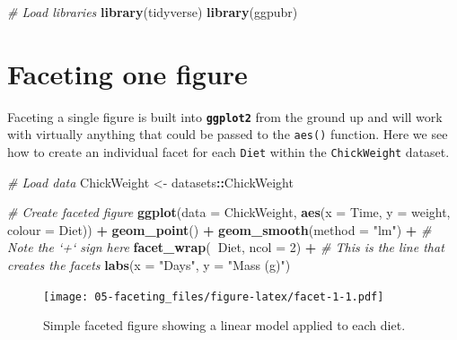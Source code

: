 \documentclass[]{book}
\newenvironment{Shaded}{\begin{snugshade}}{\end{snugshade}}
\newcommand{\KeywordTok}[1]{\textcolor[rgb]{0.13,0.29,0.53}{\textbf{#1}}}
\newcommand{\DataTypeTok}[1]{\textcolor[rgb]{0.13,0.29,0.53}{#1}}
\newcommand{\DecValTok}[1]{\textcolor[rgb]{0.00,0.00,0.81}{#1}}
\newcommand{\StringTok}[1]{\textcolor[rgb]{0.31,0.60,0.02}{#1}}
\newcommand{\CommentTok}[1]{\textcolor[rgb]{0.56,0.35,0.01}{\textit{#1}}}
\newcommand{\OperatorTok}[1]{\textcolor[rgb]{0.81,0.36,0.00}{\textbf{#1}}}
\newcommand{\NormalTok}[1]{#1}
\theoremstyle{definition}
\theoremstyle{definition}
\theoremstyle{definition}
\theoremstyle{remark}
\begin{document}
\begin{Shaded}
\begin{Highlighting}[]
\CommentTok{# Load libraries}
\KeywordTok{library}\NormalTok{(tidyverse)}
\KeywordTok{library}\NormalTok{(ggpubr)}
\end{Highlighting}
\end{Shaded}

\section{Faceting one figure}\label{faceting-one-figure}

Faceting a single figure is built into \textbf{\texttt{ggplot2}} from
the ground up and will work with virtually anything that could be passed
to the \texttt{aes()} function. Here we see how to create an individual
facet for each \texttt{Diet} within the \texttt{ChickWeight} dataset.

\begin{Shaded}
\begin{Highlighting}[]
\CommentTok{# Load data}
\NormalTok{ChickWeight <-}\StringTok{ }\NormalTok{datasets}\OperatorTok{::}\NormalTok{ChickWeight}

\CommentTok{# Create faceted figure}
\KeywordTok{ggplot}\NormalTok{(}\DataTypeTok{data =}\NormalTok{ ChickWeight, }\KeywordTok{aes}\NormalTok{(}\DataTypeTok{x =}\NormalTok{ Time, }\DataTypeTok{y =}\NormalTok{ weight, }\DataTypeTok{colour =}\NormalTok{ Diet)) }\OperatorTok{+}
\StringTok{  }\KeywordTok{geom_point}\NormalTok{() }\OperatorTok{+}
\StringTok{  }\KeywordTok{geom_smooth}\NormalTok{(}\DataTypeTok{method =} \StringTok{"lm"}\NormalTok{) }\OperatorTok{+}\StringTok{ }\CommentTok{# Note the `+` sign here}
\StringTok{  }\KeywordTok{facet_wrap}\NormalTok{(}\OperatorTok{~}\NormalTok{Diet, }\DataTypeTok{ncol =} \DecValTok{2}\NormalTok{) }\OperatorTok{+}\StringTok{ }\CommentTok{# This is the line that creates the facets}
\StringTok{  }\KeywordTok{labs}\NormalTok{(}\DataTypeTok{x =} \StringTok{"Days"}\NormalTok{, }\DataTypeTok{y =} \StringTok{"Mass (g)"}\NormalTok{)}
\end{Highlighting}
\end{Shaded}

\begin{figure}
\centering
\texttt{[image: 05-faceting\_files/figure-latex/facet-1-1.pdf]}
\caption{\label{fig:facet-1}Simple faceted figure showing a linear model
applied to each diet.}
\end{figure}
\end{document}
